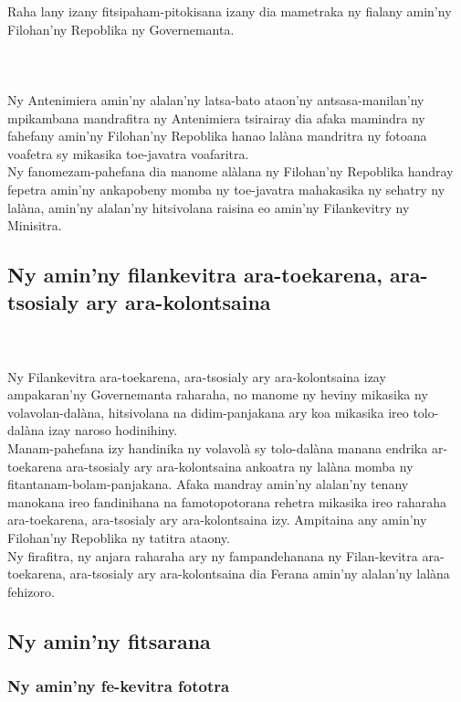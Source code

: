 \documentclass[12pt]{article}
\newcounter{laharana}
\newcommand{\andininy}[0]{
  \paragraph{%
    \NoCaseChange{%
      Andininy~\addtocounter{laharana}{1}\thelaharana.}\label{and:\thelaharana}~%
  }%
}
\begin{document}
\noindent
Raha lany izany fitsipaham-pitokisana izany dia mametraka ny fialany amin'ny
Filohan'ny Repoblika ny Governemanta.

\andininy{}Ny Antenimiera amin'ny alalan'ny latsa-bato ataon'ny
antsasa-manilan'ny mpikambana mandrafitra ny Antenimiera tsirairay dia afaka
mamindra ny fahefany amin'ny Filohan'ny Repoblika hanao lalàna mandritra ny
fotoana voafetra sy mikasika toe-javatra voafaritra.\\

\noindent
Ny fanomezam-pahefana dia manome alàlana ny Filohan'ny Repoblika handray fepetra
amin'ny ankapobeny momba ny toe-javatra mahakasika ny sehatry ny lalàna, amin'ny
alalan'ny hitsivolana raisina eo amin'ny Filankevitry ny Minisitra.

\subsection{Ny amin'ny filankevitra ara-toekarena, ara-tsosialy ary ara-kolontsaina}
\label{sec:ny-aminny-filank}

\andininy{}Ny Filankevitra ara-toekarena, ara-tsosialy ary ara-kolontsaina
izay ampakaran'ny Governemanta raharaha, no manome ny heviny mikasika ny
volavolan-dalàna, hitsivolana na didim-panjakana ary koa mikasika ireo
tolo-dalàna izay naroso hodinihiny.\\

\noindent
Manam-pahefana izy handinika ny volavolà sy tolo-dalàna manana endrika
ar-toekarena ara-tsosialy ary ara-kolontsaina ankoatra ny lalàna momba ny
fitantanam-bolam-panjakana. Afaka mandray amin'ny alalan'ny tenany manokana ireo
fandinihana na famotopotorana rehetra mikasika ireo raharaha ara-toekarena,
ara-tsosialy ary ara-kolontsaina izy. Ampitaina any amin'ny Filohan'ny Repoblika
ny tatitra ataony.\\

\noindent
Ny firafitra, ny anjara raharaha ary ny fampandehanana ny Filan-kevitra
ara-toekarena, ara-tsosialy ary ara-kolontsaina dia Ferana amin'ny alalan'ny
lalàna fehizoro.

\subsection{Ny amin'ny fitsarana}
\label{sec:ny-aminny-fitsarana}

\subsubsection{Ny amin'ny fe-kevitra fototra}
\label{sec:ny-aminny-fe}
\end{document}
